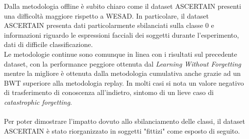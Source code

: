 Dalla metodologia offline è subito chiaro come il dataset ASCERTAIN presenti una difficoltà maggiore rispetto a WESAD. In particolare, il dataset ASCERTAIN presenta dati particolarmente sbilanciati sulla classe 0 e informazioni riguardo le espressioni facciali dei soggetti durante l'esperimento, dati di difficile classificazione.\\
Le metodologie continue sono comunque in linea con i risultati sul precedente dataset, con la performance peggiore ottenuta dal \textit{Learning Without Forgetting} mentre la migliore è ottenuta dalla metodologia cumulativa anche grazie ad un BWT superiore alla metodologia replay. In molti casi si nota un valore negativo di trasferimento di conoscenza all'indietro, sintomo di un lieve caso di \textit{catastrophic forgetting}.\\\\
Per poter dimostrare l'impatto dovuto allo sbilanciamento delle classi, il dataset ASCERTAIN è stato riorganizzato in soggetti "fittizi" come esposto di seguito.
